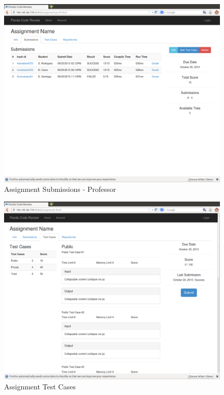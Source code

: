 \begin{figure}[H]
	\centering
	\includegraphics[width=\textwidth]{img/assignment-sub-prof}
	\caption{Assignment Submissions - Professor}
\end{figure}

\begin{figure}[H]
	\centering
	\includegraphics[width=\textwidth]{img/assignment-test}
	\caption{Assignment Test Cases}
\end{figure}



